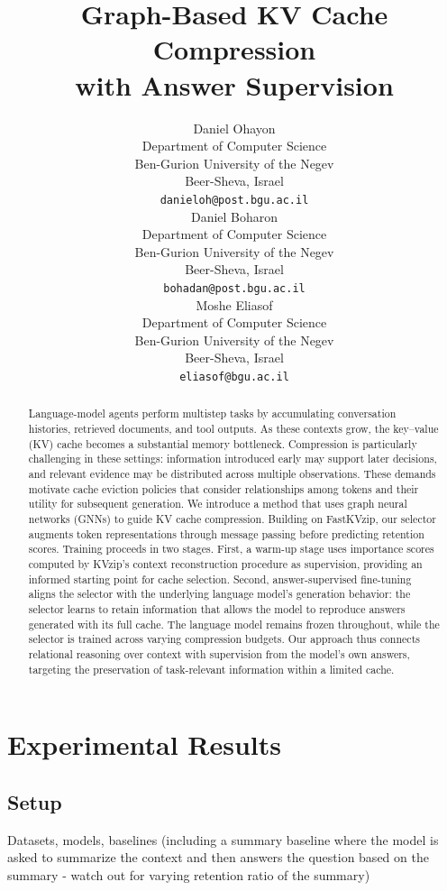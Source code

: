 \documentclass{article} %
\title{Graph-Based KV Cache Compression\\with Answer Supervision}
\author{Daniel Ohayon \\
Department of Computer Science\\
Ben-Gurion University of the Negev\\
Beer-Sheva, Israel \\
\texttt{danieloh@post.bgu.ac.il} \\
\AND
Daniel Boharon \\
Department of Computer Science\\
Ben-Gurion University of the Negev\\
Beer-Sheva, Israel \\
\texttt{bohadan@post.bgu.ac.il} \\
\AND
Moshe Eliasof \\
Department of Computer Science\\
Ben-Gurion University of the Negev\\
Beer-Sheva, Israel \\
\texttt{eliasof@bgu.ac.il} \\
}
\begin{document}
\maketitle

\begin{abstract}
Language-model agents perform multistep tasks by accumulating conversation histories, retrieved documents, and tool outputs. As these contexts grow, the key–value (KV) cache becomes a substantial memory bottleneck. Compression is particularly challenging in these settings: information introduced early may support later decisions, and relevant evidence may be distributed across multiple observations. These demands motivate cache eviction policies that consider relationships among tokens and their utility for subsequent generation. We introduce a method that uses graph neural networks (GNNs) to guide KV cache compression. Building on FastKVzip, our selector augments token representations through message passing before predicting retention scores. Training proceeds in two stages. First, a warm-up stage uses importance scores computed by KVzip’s context reconstruction procedure as supervision, providing an informed starting point for cache selection. Second, answer-supervised fine-tuning aligns the selector with the underlying language model’s generation behavior: the selector learns to retain information that allows the model to reproduce answers generated with its full cache. The language model remains frozen throughout, while the selector is trained across varying compression budgets. Our approach thus connects relational reasoning over context with supervision from the model’s own answers, targeting the preservation of task-relevant information within a limited cache.
\end{abstract}







\section{Experimental Results}

\subsection{Setup}

Datasets, models, baselines (including a summary baseline where the model is asked to summarize the context and then answers the question based on the summary - watch out for varying retention ratio of the summary)
\end{document}
